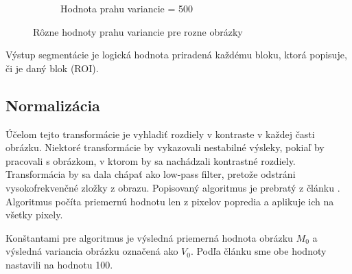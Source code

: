 \documentclass[11pt,a4paper]{article}
\begin{document}
\begin{figure}[h!]
\begin{subfigure}{0.33\textwidth}
		\caption{Hodnota prahu variancie = 500}
		\label{fig:tiger}
	\end{subfigure}%
	\caption{Rôzne hodnoty prahu variancie pre rozne obrázky}\label{fig:2}
\end{figure}

Výstup segmentácie je logická hodnota priradená každému bloku, ktorá popisuje, či je daný blok (ROI).








\subsection*{Normalizácia}
Účelom tejto transformácie je vyhladiť rozdiely v kontraste v každej časti obrázku. Niektoré transformácie by vykazovali nestabilné výsleky, pokiaľ by pracovali s obrázkom, v ktorom by sa nachádzali kontrastné rozdiely.
Transformácia by sa dala chápať ako low-pass filter, pretože odstráni vysokofrekvenčné zložky z obrazu.
Popisovaný algoritmus je prebratý z článku \cite{thai}. Algoritmus počíta priemernú hodnotu len z pixelov popredia a aplikuje ich na všetky pixely.

Konštantami pre algoritmus je výsledná priemerná hodnota obrázku $M_0$ a výsledná variancia obrázku označená ako  $V_0$. Podľa článku sme obe hodnoty nastavili na hodnotu 100.
\end{document}
